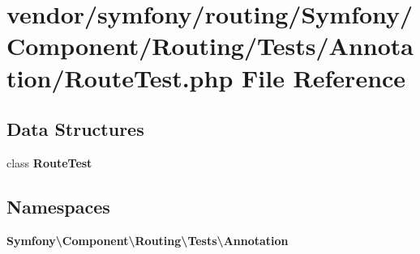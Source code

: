 \section{vendor/symfony/routing/\+Symfony/\+Component/\+Routing/\+Tests/\+Annotation/\+Route\+Test.php File Reference}
\label{_annotation_2_route_test_8php}
\subsection*{Data Structures}
\begin{DoxyCompactItemize}
\item 
class {\bf Route\+Test}
\end{DoxyCompactItemize}
\subsection*{Namespaces}
\begin{DoxyCompactItemize}
\item 
 {\bf Symfony\textbackslash{}\+Component\textbackslash{}\+Routing\textbackslash{}\+Tests\textbackslash{}\+Annotation}
\end{DoxyCompactItemize}
